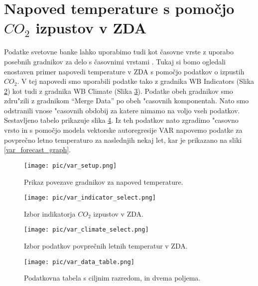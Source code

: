 \section{Napoved temperature s pomočjo $CO_2$ izpustov v ZDA}

Podatke svetovne banke lahko uporabimo tudi kot časovne vrste z uporabo
posebnih gradnikov za delo s časovnimi vrstami \cite{time_series}. Tukaj si
bomo ogledali enostaven primer napovedi temperature v ZDA s pomočjo podatkov o
izpustih $CO_2$. V tej napovedi smo uporabili podatke tako z gradnika 
WB Indicators (Slika \ref{var_indicator_select})
kot tudi z gradnika WB Climate (Slika \ref{var_climate_select}). Podatke obeh
gradnikov smo zdru"zili z gradnikom ``Merge Data'' po obeh "casovnih
komponentah. Nato smo odstranili vnose "casovnih obdobij za katere nimamo na
voljo vseh podatkov. Sestavljeno tabelo prikazuje slika \ref{var_data_table}.
Iz teh podatkov nato zgradimo "casovno vrsto in s pomočjo modela vektorske 
autoregresije VAR \cite{var_model} napovemo podatke za povprečno 
letno temperaturo za naslednjih nekaj let, kar je prikazano na sliki 
\ref{var_forecast_graph}.

\begin{figure}
\begin{center}
\texttt{[image: pic/var\_setup.png]}
\end{center}
\caption{Prikaz povezave gradnikov za napoved temperature.}
\label{var_setup}
\end{figure} 

\begin{figure}[H]
\begin{center}
\texttt{[image: pic/var\_indicator\_select.png]}
\end{center}
\caption{Izbor indikatorja $CO_2$ izpustov v ZDA.}
\label{var_indicator_select}
\end{figure} 

\begin{figure}[H]
\begin{center}
\texttt{[image: pic/var\_climate\_select.png]}
\end{center}
\caption{Izbor podatkov povprečnih letnih temperatur v ZDA.}
\label{var_climate_select}
\end{figure} 

\begin{figure}[H]
\begin{center}
\texttt{[image: pic/var\_data\_table.png]}
\end{center}
\caption{Podatkovna tabela s ciljnim razredom, in dvema poljema.}
\label{var_data_table}
\end{figure} 

